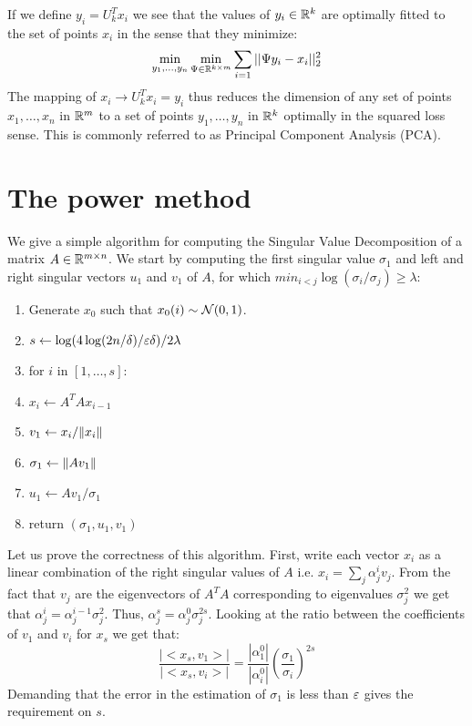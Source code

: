 \documentclass{article}
\begin{document}
If we define $y_i = U_{k}^{T}x_{i}$ we see that the values of $y_i \in {\mathbb{R}}^{k}$ are optimally fitted to the set of points $x_i$ in the 
sense that they minimize:
\[
\min_{y_1,\ldots,y_n } \min_{\Psi \in {\mathbb{R}}^{k \times m}}\sum_{i=1} ||\Psi y_i - x_{i}||_{2}^{2}
\] 
The mapping of $x_i \rightarrow  U_{k}^{T}x_i = y_i $ thus reduces the dimension of any set of points  $x_1,\ldots,x_n$ in ${\mathbb{R}}^{m}$ to 
a set of points $y_1,\ldots,y_n$ in ${\mathbb{R}}^{k}$ optimally in the squared loss sense. This is commonly referred to as Principal Component Analysis (PCA).


\section{The power method}

We give a simple algorithm for computing the Singular Value Decomposition of a matrix $A \in {\mathbb{R}}^{m \times n}$.
We start by computing the first singular value $\sigma_1$ and left and right singular vectors $u_1$ and $v_1$ of $A$,
for which $min_{i<j}\log(\sigma_i/\sigma_j) \ge \lambda$:
\begin{enumerate}
\item Generate $x_0$ such that $x_0(i) \sim {\mathcal{N}}(0,1)$.
\item $s \leftarrow  \log(4\log(2n/\delta)/\varepsilon\delta)/2\lambda$ 
\item for $i$ in $[1,\ldots,s]$:
\item \tab $x_i \leftarrow A^{T}Ax_{i-1}$
\item $v_1 \leftarrow x_i/\| x_i \|$  
\item $\sigma_1 \leftarrow \| Av_1 \|$
\item $u_1 \leftarrow Av_1/\sigma_1$ 
\item return $(\sigma_1,u_1,v_1)$ 
\end{enumerate}
Let us prove the correctness of this algorithm.
First, write each vector $x_i$ as a linear combination of the right singular values of $A$ i.e. $x_i = \sum_{j} \alpha^{i}_{j}v_j$. 
From the fact that $v_j$ are the eigenvectors of $A^{T}A$ corresponding to eigenvalues $\sigma^{2}_j$ 
we get that $\alpha^{i}_{j}= \alpha^{i-1}_{j}\sigma^{2}_{j}$.
Thus, $\alpha^{s}_{j} = \alpha^{0}_{j}\sigma^{2s}_{j}$. Looking at the ratio between the coefficients of $v_1$ and $v_i$ for $x_s$
we get that:
 \[
 \frac{|<x_s,v_1>|}{|<x_s,v_i>|} = \frac{|\alpha^{0}_{1}|}{|\alpha^{0}_{i}|}\left(\frac{\sigma_1}{\sigma_i}\right)^{2s}
\]
Demanding that the error in the estimation of $\sigma_1$ is less than $\varepsilon$ gives the requirement on $s$.
\end{document}
